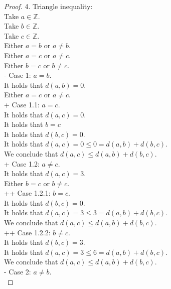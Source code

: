 \documentclass{article}
\newcommand\tab[1][1cm]{\hspace*{#1}}
\theoremstyle{mytheoremstyle}
\theoremstyle{mytheoremstyle}
\theoremstyle{myproblemstyle}
\begin{document}
\begin{proof}
        4. Triangle inequality: \\
        Take $a \in \mathbb{Z}$. \\
        Take $b \in \mathbb{Z}$. \\
        Take $c \in \mathbb{Z}$. \\
        Either $a = b$ or $a \ne b$. \\
        Either $a = c$ or $a \ne c$. \\
        Either $b = c$ or $b \ne c$. \\
        - Case 1: $a = b$. \\
        \tab It holds that $d(a,b) = 0$. \\
        \tab Either $a = c$ or $a \ne c$. \\
        \tab + Case 1.1: $a = c$. \\
        \tab \tab It holds that $d(a,c) = 0$. \\
        \tab \tab It holds that $b = c$ \\
        \tab \tab It holds that $d(b,c) = 0$. \\
        \tab \tab It holds that $d(a,c) = 0 \le 0 = d(a,b) + d(b,c)$. \\
        \tab \tab We conclude that $d(a,c) \leq d(a,b) + d(b,c)$. \\
        \tab + Case 1.2: $a \ne c$. \\
        \tab \tab It holds that $d(a,c) = 3$. \\
        \tab \tab Either $b = c$ or $b \ne c$. \\
        \tab \tab \tab ++ Case 1.2.1: $b = c$. \\
        \tab \tab \tab \tab It holds that $d(b,c) = 0$. \\
        \tab \tab \tab \tab It holds that $d(a,c) = 3 \leq 3 = d(a,b) + d(b,c)$. \\
        \tab \tab \tab \tab We conclude that $d(a,c) \leq d(a,b) + d(b,c)$. \\
        \tab \tab \tab ++ Case 1.2.2: $b \ne c$. \\
        \tab \tab \tab \tab It holds that $d(b,c) = 3$. \\
        \tab \tab \tab \tab It holds that $d(a,c) = 3 \leq 6 = d(a,b) + d(b,c)$. \\
        \tab \tab \tab \tab We conclude that $d(a,c) \leq d(a,b) + d(b,c)$. \\
        - Case 2: $a \ne b$. \\

\end{proof}
\end{document}
